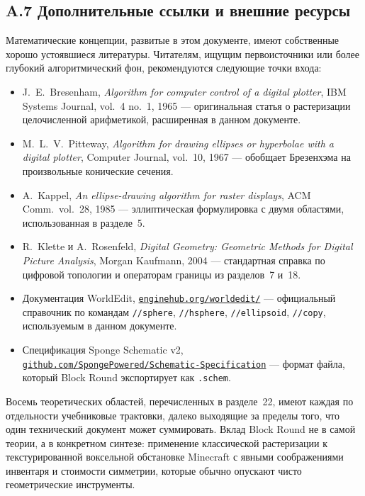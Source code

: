 \documentclass[12pt,a4paper]{scrartcl}
\newcommand{\code}[1]{\texttt{\small #1}}
\newcommand{\cmd}[1]{\textcolor{earth}{\texttt{\small #1}}}
\newcommand{\biblink}[2]{\href{#1}{\nolinkurl{#2}}}
\begin{document}
\subsection*{A.7 Дополнительные ссылки и внешние ресурсы}

Математические концепции, развитые в этом документе, имеют собственные хорошо устоявшиеся литературы. Читателям, ищущим первоисточники или более глубокий алгоритмический фон, рекомендуются следующие точки входа:

\begin{itemize}[leftmargin=1.4em,itemsep=0.2em,topsep=0.3em]
  \item J.~E.~Bresenham, \emph{Algorithm for computer control of a digital plotter}, IBM Systems Journal, vol.~4 no.~1, 1965 --- оригинальная статья о растеризации целочисленной арифметикой, расширенная в данном документе.
  \item M.~L.~V.~Pitteway, \emph{Algorithm for drawing ellipses or hyperbolae with a digital plotter}, Computer Journal, vol.~10, 1967 --- обобщает Брезенхэма на произвольные конические сечения.
  \item A.~Kappel, \emph{An ellipse-drawing algorithm for raster displays}, ACM Comm.\ vol.~28, 1985 --- эллиптическая формулировка с двумя областями, использованная в разделе~5.
  \item R.~Klette и A.~Rosenfeld, \emph{Digital Geometry: Geometric Methods for Digital Picture Analysis}, Morgan Kaufmann, 2004 --- стандартная справка по цифровой топологии и операторам границы из разделов~7 и~18.
  \item Документация WorldEdit, \biblink{https://enginehub.org/worldedit/}{enginehub.org/worldedit/} --- официальный справочник по командам \cmd{//sphere}, \cmd{//hsphere}, \cmd{//ellipsoid}, \cmd{//copy}, используемым в данном документе.
  \item Спецификация Sponge Schematic v2, \biblink{https://github.com/SpongePowered/Schematic-Specification}{github.com/SpongePowered/Schematic-Specification} --- формат файла, который Block Round экспортирует как \code{.schem}.
\end{itemize}

Восемь теоретических областей, перечисленных в разделе~22, имеют каждая по отдельности учебниковые трактовки, далеко выходящие за пределы того, что один технический документ может суммировать. Вклад Block Round не в самой теории, а в конкретном синтезе: применение классической растеризации к текстурированной воксельной обстановке Minecraft с явными соображениями инвентаря и стоимости симметрии, которые обычно опускают чисто геометрические инструменты.
\end{document}
